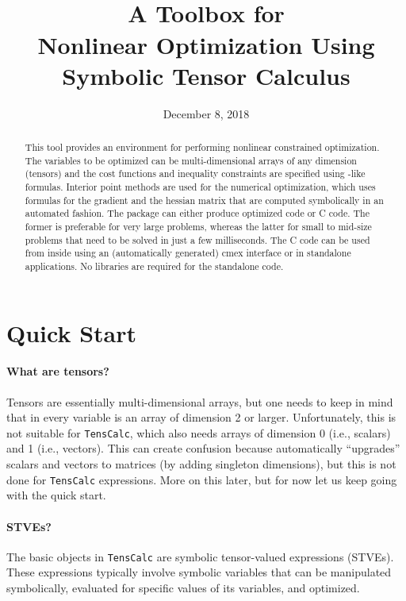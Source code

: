 \documentclass[11pt]{article}
\title{\sc \TC \\[1em]\Large A \matlab{} Toolbox for \\
  Nonlinear Optimization Using Symbolic Tensor Calculus}
\author{\jph}
\date{December 8, 2018}
\newcommand{\TC}{\texttt{TensCalc}}
\theoremstyle{remark}
\begin{document}
                        \maketitle

\begin{abstract}
  This tool provides an environment for performing nonlinear
  constrained optimization. The variables to be optimized can be
  multi-dimensional arrays of any dimension (tensors) and the cost
  functions and inequality constraints are specified using
  \matlab-like formulas. Interior point methods are used for the
  numerical optimization, which uses formulas for the gradient and the
  hessian matrix that are computed symbolically in an automated
  fashion.  The package can either produce optimized \matlab{} code or
  C code. The former is preferable for very large problems, whereas
  the latter for small to mid-size problems that need to be solved in
  just a few milliseconds. The C code can be used from inside
  \matlab{} using an (automatically generated) cmex interface or in
  standalone applications. No libraries are required for the
  standalone code.
\end{abstract}

\newpage

\tableofcontents

\newpage

\section{Quick Start}

\paragraph{What are tensors?} Tensors are essentially multi-dimensional arrays,
but one needs to keep in mind that in \matlab{} every variable is an
array of dimension 2 or larger. Unfortunately, this is not suitable
for \TC{}, which also needs arrays of dimension 0 (i.e., scalars) and
1 (i.e., vectors). This can create confusion because \matlab{}
automatically ``upgrades'' scalars and vectors to matrices (by adding
singleton dimensions), but this is not done for \TC{}
expressions. More on this later, but for now let us keep going with
the quick start.

\paragraph{STVEs?} The basic objects in \TC{} are symbolic
tensor-valued expressions (STVEs). These expressions typically involve
symbolic variables that can be manipulated symbolically, evaluated for
specific values of its variables, and optimized.
\end{document}
